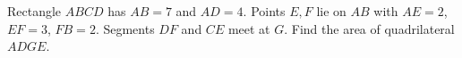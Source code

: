 Rectangle $ABCD$ has $AB=7$ and $AD=4$. Points $E,F$ lie on $AB$ with $AE=2$, $EF=3$, $FB=2$. Segments $DF$ and $CE$ meet at $G$. Find the area of quadrilateral $ADGE$.
